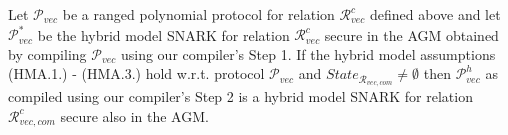 \vspace{-0.2in}

\noindent \begin{lemma} 
\label{sergey_type_relations} 
Let $\mathscr{P}_{\mathit{vec}}$ be a ranged polynomial protocol for relation $\mathcal{R}^c_{\mathit{vec}}$ defined above and let 
$\mathscr{P}_{\mathit{vec}}^{*}$ be the hybrid model SNARK for relation $\mathcal{R}^c_{\mathit{vec}}$ secure in the AGM obtained 
by compiling $\mathscr{P}_{\mathit{vec}}$ using our compiler's Step 1. If the hybrid model assumptions (HMA.1.) - (HMA.3.) hold w.r.t. 
protocol $\mathscr{P}_{\mathit{vec}}$ and $\mathit{State}_{\mathcal{R}_{\mathit{vec}, \mathit{com}}} \neq \emptyset $ then 
$\mathscr{P}_{\mathit{vec}}^{h}$ as compiled using our compiler's Step 2 is a hybrid model SNARK for relation 
$\mathcal{R}_{\mathit{vec}, \mathit{com}}^c$ secure also in the AGM.
\end{lemma}

